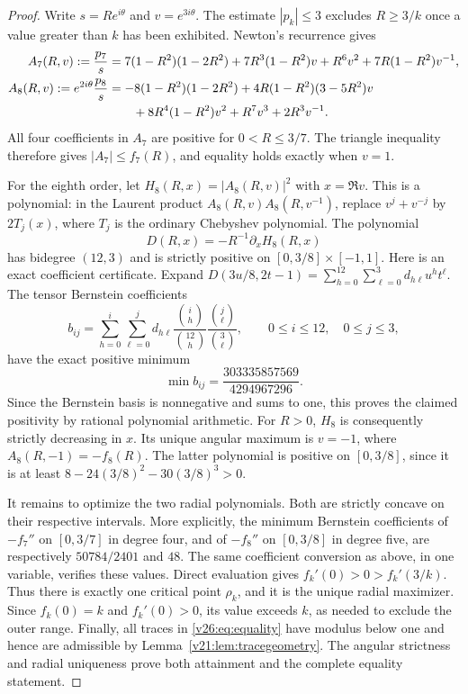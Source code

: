\documentclass[UTF8,11pt]{ctexart}
\theoremstyle{definition}
\numberwithin{equation}{section}
\begin{document}
\begin{proof}
Write $s=Re^{i\theta}$ and $v=e^{3i\theta}$. The estimate
$|p_k|\le3$ excludes $R\ge3/k$ once a value greater than $k$
has been exhibited. Newton's recurrence gives
\begin{align*}
 A_7(R,v):=\frac{p_7}{s}
  &=7(1-R^2)(1-2R^2)+7R^3(1-R^2)v
       +R^6v^2+7R(1-R^2)v^{-1},\\
 A_8(R,v):=e^{2i\theta}\frac{p_8}{s}
  &=-8(1-R^2)(1-2R^2)+4R(1-R^2)(3-5R^2)v\\
  &\hspace{7mm}+8R^4(1-R^2)v^2+R^7v^3+2R^3v^{-1}.
\end{align*}
All four coefficients in $A_7$ are positive for $0<R\le3/7$.
The triangle inequality therefore gives $|A_7|\le f_7(R)$,
and equality holds exactly when $v=1$.

For the eighth order, let $H_8(R,x)=|A_8(R,v)|^2$ with
$x=\Re v$. This is a polynomial: in the Laurent product
$A_8(R,v)A_8(R,v^{-1})$, replace $v^j+v^{-j}$ by
$2T_j(x)$, where $T_j$ is the ordinary Chebyshev polynomial.
The polynomial
\[
                     D(R,x)=-R^{-1}\partial_x H_8(R,x)
\]
has bidegree $(12,3)$ and is strictly positive on
$[0,3/8]\times[-1,1]$. Here is an exact coefficient certificate.
Expand
$D(3u/8,2t-1)=\sum_{h=0}^{12}\sum_{\ell=0}^3 d_{h\ell}u^h t^\ell$.
The tensor Bernstein coefficients
\[
 b_{ij}=\sum_{h=0}^{i}\sum_{\ell=0}^{j}
 d_{h\ell}\frac{\binom ih}{\binom{12}h}
             \frac{\binom j\ell}{\binom3\ell},
 \qquad 0\le i\le12,\quad0\le j\le3,
\]
have the exact positive minimum
\begin{equation}\label{v26:eq:angularcertificate}
                      \min b_{ij}=\frac{303335857569}{4294967296}.
\end{equation}
Since the Bernstein basis is nonnegative and sums to one, this
proves the claimed positivity by rational polynomial arithmetic.
For $R>0$, $H_8$ is consequently strictly decreasing in $x$.
Its unique angular maximum is $v=-1$, where
$A_8(R,-1)=-f_8(R)$. The latter polynomial is positive on
$[0,3/8]$, since it is at least
$8-24(3/8)^2-30(3/8)^3>0$.

It remains to optimize the two radial polynomials. Both are
strictly concave on their respective intervals. More explicitly,
the minimum Bernstein coefficients of $-f_7''$ on $[0,3/7]$
in degree four, and of $-f_8''$ on $[0,3/8]$ in degree five,
are respectively $50784/2401$ and $48$. The same coefficient
conversion as above, in one variable, verifies these values.
Direct evaluation gives $f_k'(0)>0>f_k'(3/k)$.
Thus there is exactly one critical point $\rho_k$, and it is
the unique radial maximizer. Since $f_k(0)=k$ and $f_k'(0)>0$,
its value exceeds $k$, as needed to exclude the outer range.
Finally, all traces in \eqref{v26:eq:equality} have modulus below
one and hence are admissible by Lemma~\ref{v21:lem:tracegeometry}.
The angular strictness and radial uniqueness prove both
attainment and the complete equality statement.
\end{proof}
\end{document}
